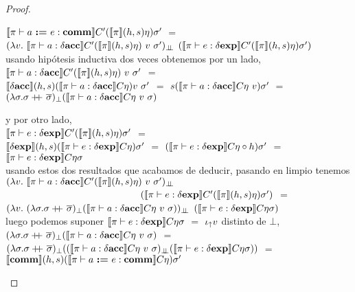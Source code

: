 \begin{proof}
\begin{itemize}
\begin{itemize}
$\llbracket \pi \vdash a \ \textbf{:=} \ e : \textbf{comm} \rrbracket C'(\llbracket \pi \rrbracket(h,s)\eta)\sigma'$ $=$\\
$(\lambda v. \ 
	\semBrcks{\pi \vdash a : \deltaacc}C'(\semBrcks{\pi}(h,s)\eta)\ v \ \sigma')_{\dbot}$
$(\llbracket \pi \vdash e : \delta \textbf{exp} \rrbracket C'(\llbracket \pi \rrbracket(h,s)\eta)\sigma')$ \\

usando hip\'otesis inductiva dos veces obtenemos por un lado,\\

$\llbracket \pi \vdash a : \delta \textbf{acc} \rrbracket C'(\llbracket \pi \rrbracket(h,s)\eta)\ v \ \sigma'$ $=$\\
$\llbracket \delta \textbf{acc} \rrbracket(h,s)(\llbracket \pi \vdash a : \delta \textbf{acc} \rrbracket C\eta) v \ \sigma'$ $=$
$s(\llbracket \pi \vdash a : \delta \textbf{acc} \rrbracket C \eta \ v)\sigma'$ $=$\\
$(\lambda \sigma . \sigma \concat \sigmaover)_{\bot}
				(\semBrcks{\pi \vdash a : \deltaacc} C \eta \ v \ \sigma)$
				
y por otro lado,\\

$\llbracket \pi \vdash e : \delta \textbf{exp} \rrbracket C'(\llbracket \pi \rrbracket(h,s)\eta)\sigma'$ $=$\\
$\llbracket \delta \textbf{exp} \rrbracket(h,s)(\llbracket \pi \vdash e : \delta \textbf{exp} \rrbracket C \eta)\sigma'$ $=$
$(\llbracket \pi \vdash e : \delta \textbf{exp} \rrbracket C \eta \circ h)\sigma'$ $=$\\
$\llbracket \pi \vdash e : \delta \textbf{exp} \rrbracket C \eta \sigma$\\

usando estos dos resultados que acabamos de deducir, pasando en limpio tenemos\\

$(\lambda v. \ 
	\semBrcks{\pi \vdash a : \deltaacc}C'(\semBrcks{\pi}(h,s)\eta)\ v \ \sigma')_{\dbot}$\\
\indent \ \ \ \ \ \ \ \ \ \ \ \ \ \ \ \ \ \ \ \ \ \ \ \ \ \ \ \
$(\llbracket \pi \vdash e : \delta \textbf{exp} \rrbracket C'(\llbracket \pi \rrbracket(h,s)\eta)\sigma')$ $=$\\
$(\lambda v. \ (\lambda \sigma . \sigma \concat \sigmaover)_{\bot}
				(\semBrcks{\pi \vdash a : \deltaacc} C \eta \ v \ \sigma))_{\dbot}$
$(\llbracket \pi \vdash e : \delta \textbf{exp} \rrbracket C \eta \sigma)$ \\

luego podemos suponer $\llbracket \pi \vdash e : \delta \textbf{exp} \rrbracket C \eta \sigma$ $=$ $\iota_{\uparrow} v$ distinto
de $\bot$,\\

$(\lambda \sigma . \sigma \concat \sigmaover)_{\bot}
				(\semBrcks{\pi \vdash a : \deltaacc} C \eta \ v \ \sigma)$ $=$\\
$(\lambda \sigma . \sigma +\kern-1.3ex+\kern0.8ex \overline{\sigma})_{\bot}
	((\llbracket \pi \vdash a : \delta \textbf{acc} \rrbracket C \eta \ v \ \sigma)_{\bot \!\!\! \bot}
			(\llbracket \pi \vdash e : \delta \textbf{exp} \rrbracket C \eta \sigma))$ $=$\\
$\llbracket \textbf{comm} \rrbracket(h,s)(\llbracket \pi \vdash a \ \textbf{:=} \ e : \textbf{comm} \rrbracket C\eta)\sigma'$\\


\end{itemize}
\end{itemize}
\end{proof}
